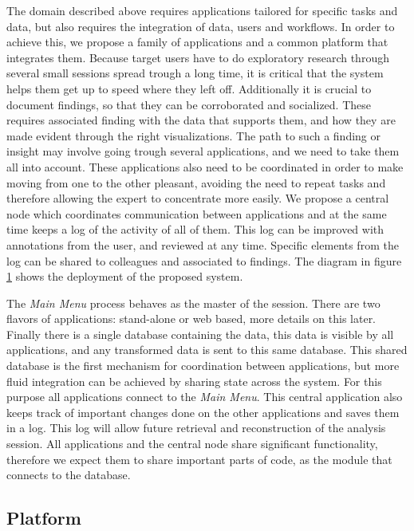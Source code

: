 The domain described above requires applications tailored for specific tasks and data, but also requires the integration of data, users and workflows. In order to achieve this, we propose a family of applications and a common platform that integrates them. Because target users have to do exploratory research through several small sessions spread trough a long time, it is critical that the system helps them get up to speed where they left off. Additionally it is crucial to document findings, so that they can be corroborated and socialized. These requires associated finding with the data that supports them, and how they are made evident through the right visualizations. The path to such a finding or insight may involve going trough several applications, and we need to take them all into account. These applications also need to be coordinated in order to make moving from one to the other pleasant, avoiding the need to repeat tasks and therefore allowing the expert to concentrate more easily. We propose a central node which coordinates communication between applications and at the same time keeps a log of the activity of all of them. This log can be improved with annotations from the user, and reviewed at any time. Specific elements from the log can be shared to colleagues and associated to findings. The diagram in figure \ref{fig_deployment} shows the deployment of the proposed system.

\begin{figure}
\caption{\label{fig_deployment}}
\end{figure}

The \emph{Main Menu} process behaves as the master of the session. There are two flavors of applications: stand-alone or web based, more details on this later. Finally there is a single database containing the data, this data is visible by all applications, and any transformed data is sent to this same database. This shared database is the first mechanism for coordination between applications, but more fluid integration can be achieved by sharing state across the system. For this purpose all applications connect to the \emph{Main Menu}. This central application also keeps track of important changes done on the other applications and saves them in a log. This log will allow future retrieval and reconstruction of the analysis session. All applications and the central node share significant functionality, therefore we expect them to share important parts of code, as the module that connects to the database. 

\subsection{Platform}

